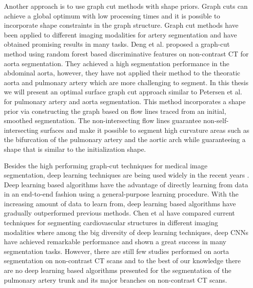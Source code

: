 %
%
%

Another approach is to use graph cut methods with shape priors. Graph cuts can achieve a global optimum with low processing times and it is possible to incorporate shape constraints in the graph structure. Graph cut methods have been applied to different imaging modalities for artery segmentation \cite{deng2018graph, arias2015carotid} and have obtained promising results in many tasks. Deng et al. \cite{deng2018graph} proposed a graph-cut method using random forest based discriminative features on non-contrast \gls{CT} for aorta segmentation. They achieved a high segmentation performance in the abdominal aorta, however, they have not applied their method to the theoratic aorta and pulmonary artery which are more challenging to segment. In this thesis we will present an optimal surface graph cut approach similar to Petersen et al. \cite{petersen2014optimal} for pulmonary artery and aorta segmentation. This method incorporates a shape prior via constructing the graph based on flow lines traced from an initial, smoothed segmentation. The non-intersecting flow lines guarantee non-self-intersecting surfaces and make it possible to segment high curvature areas such as the bifurcation of the pulmonary artery and the aortic arch while guaranteeing a shape that is similar to the initialization shape.


Besides the high performing graph-cut techniques for medical image segmentation, deep learning techniques are being used widely in the recent years \cite{roman20183d, trullo2017joint, noothout2018automatic, bruns2019cnn, chen2020deep,dou20173d, fantazzini20203d}. Deep learning based algorithms have the advantage of directly learning from data in an end-to-end fashion using a general-purpose learning procedure. With the increasing amount of data to learn from, deep learning based algorithms have gradually outperformed previous methods. Chen et al \cite{chen2020deep} have compared current techniques for segmenting cardiovascular structures in different imaging modalities where among the big diversity of deep learning techniques, deep \gls{CNN}s have achieved remarkable performance and shown a great success in many segmentation tasks. However, there are still few studies performed on aorta segmentation on non-contrast \gls{CT} scans \cite{trullo2017joint, noothout2018automatic, bruns2019cnn} and to the best of our knowledge there are no deep learning based algorithms presented for the segmentation of the pulmonary artery trunk and its major branches on non-contrast \gls{CT} scans. 


